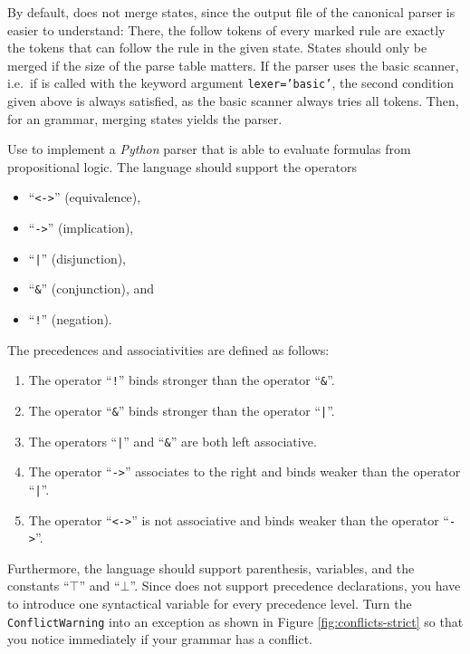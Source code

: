 \remarkEng
By default,  does not merge states, since the output file of the canonical parser is easier
to understand:  There, the follow tokens of every marked rule are exactly the tokens that can follow the rule
in the given state.  States should only be merged if the size of the parse table matters.  If the parser uses
the basic scanner, i.e.~if  is called with the keyword argument \texttt{lexer='basic'}, the
second condition given above is always satisfied, as the basic scanner always tries all tokens.  Then, for an
 grammar, merging states yields the  parser.
\eox

\exerciseEng
Use  to implement a \textsl{Python} parser that is able to evaluate formulas from propositional logic.
The language should support the operators
\begin{itemize}
\item ``\texttt{<->}'' (equivalence), 
\item ``\texttt{->}'' (implication),
\item ``\texttt{|}'' (disjunction), 
\item ``\texttt{\&}'' (conjunction), and 
\item ``\texttt{!}'' (negation).
\end{itemize}
The precedences and associativities are defined as follows:
\begin{enumerate}
\item The operator ``\texttt{!}''  binds stronger than the operator ``\texttt{\&}''.
\item The operator ``\texttt{\&}'' binds stronger than the operator ``\texttt{|}''.  
\item The operators ``\texttt{|}'' and ``\texttt{\&}'' are both left associative.  
\item The operator ``\texttt{->}'' associates to the right and binds weaker than the operator ``\texttt{|}''. 
\item The operator ``\texttt{<->}'' is not associative and binds weaker than the operator ``\texttt{->}''.
\end{enumerate}
Furthermore, the language should support parenthesis, variables, and the constants ``$\top$'' and ``$\bot$''.
Since  does not support precedence declarations, you have to introduce one syntactical variable
for every precedence level.  Turn the \texttt{ConflictWarning} into an exception as shown in Figure
\ref{fig:conflicts-strict} so that you notice immediately if your grammar has a conflict.

